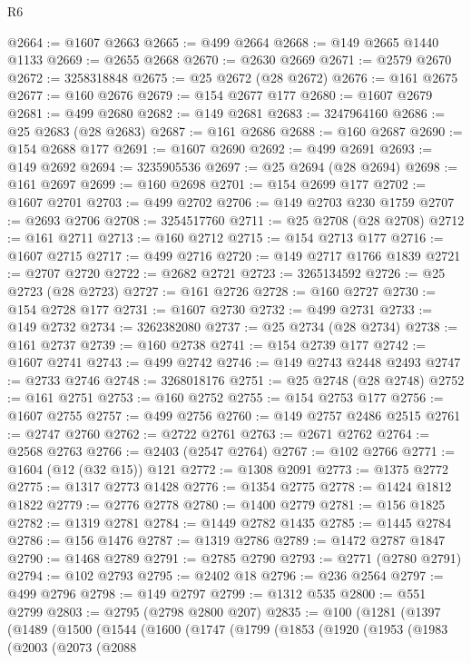 \begin{lexlean}{R6}
\begin{coremodule}
@2664 := @1607 @2663
@2665 := @499 @2664
@2668 := @149 @2665 @1440 @1133
@2669 := @2655 @2668
@2670 := @2630 @2669
@2671 := @2579 @2670
@2672 := 3258318848
@2675 := @25 @2672 (@28 @2672)
@2676 := @161 @2675
@2677 := @160 @2676
@2679 := @154 @2677 @177
@2680 := @1607 @2679
@2681 := @499 @2680
@2682 := @149 @2681
@2683 := 3247964160
@2686 := @25 @2683 (@28 @2683)
@2687 := @161 @2686
@2688 := @160 @2687
@2690 := @154 @2688 @177
@2691 := @1607 @2690
@2692 := @499 @2691
@2693 := @149 @2692
@2694 := 3235905536
@2697 := @25 @2694 (@28 @2694)
@2698 := @161 @2697
@2699 := @160 @2698
@2701 := @154 @2699 @177
@2702 := @1607 @2701
@2703 := @499 @2702
@2706 := @149 @2703 @230 @1759
@2707 := @2693 @2706
@2708 := 3254517760
@2711 := @25 @2708 (@28 @2708)
@2712 := @161 @2711
@2713 := @160 @2712
@2715 := @154 @2713 @177
@2716 := @1607 @2715
@2717 := @499 @2716
@2720 := @149 @2717 @1766 @1839
@2721 := @2707 @2720
@2722 := @2682 @2721
@2723 := 3265134592
@2726 := @25 @2723 (@28 @2723)
@2727 := @161 @2726
@2728 := @160 @2727
@2730 := @154 @2728 @177
@2731 := @1607 @2730
@2732 := @499 @2731
@2733 := @149 @2732
@2734 := 3262382080
@2737 := @25 @2734 (@28 @2734)
@2738 := @161 @2737
@2739 := @160 @2738
@2741 := @154 @2739 @177
@2742 := @1607 @2741
@2743 := @499 @2742
@2746 := @149 @2743 @2448 @2493
@2747 := @2733 @2746
@2748 := 3268018176
@2751 := @25 @2748 (@28 @2748)
@2752 := @161 @2751
@2753 := @160 @2752
@2755 := @154 @2753 @177
@2756 := @1607 @2755
@2757 := @499 @2756
@2760 := @149 @2757 @2486 @2515
@2761 := @2747 @2760
@2762 := @2722 @2761
@2763 := @2671 @2762
@2764 := @2568 @2763
@2766 := @2403 (@2547 @2764)
@2767 := @102 @2766
@2771 := @1604 (@12 (@32 @15)) @121
@2772 := @1308 @2091
@2773 := @1375 @2772
@2775 := @1317 @2773 @1428
@2776 := @1354 @2775
@2778 := @1424 @1812 @1822
@2779 := @2776 @2778
@2780 := @1400 @2779
@2781 := @156 @1825
@2782 := @1319 @2781
@2784 := @1449 @2782 @1435
@2785 := @1445 @2784
@2786 := @156 @1476
@2787 := @1319 @2786
@2789 := @1472 @2787 @1847
@2790 := @1468 @2789
@2791 := @2785 @2790
@2793 := @2771 (@2780 @2791)
@2794 := @102 @2793
@2795 := @2402 @18
@2796 := @236 @2564
@2797 := @499 @2796
@2798 := @149 @2797
@2799 := @1312 @535
@2800 := @551 @2799
@2803 := @2795 (@2798 @2800 @207)
@2835 := @100
    (@1281
      (@1397
        (@1489
          (@1500
            (@1544
              (@1600
                (@1747
                  (@1799
                    (@1853
                      (@1920
                        (@1953
                          (@1983
                            (@2003
                              (@2073
                                (@2088

\end{coremodule}
\end{lexlean}

